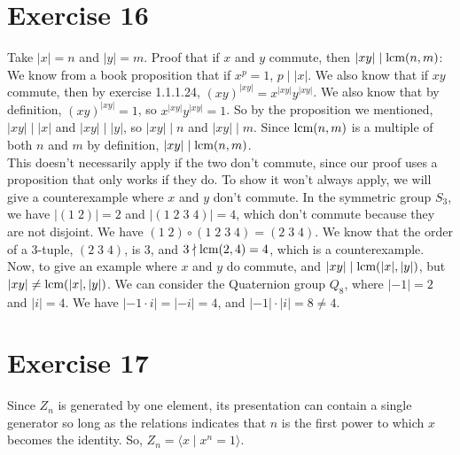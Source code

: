 \documentclass[12pt]{article}
\begin{document}
    \section*{Exercise 16}
    Take $|x| = n$ and $|y| = m$.
    Proof that if $x$ and $y$ commute,
    then $|xy| \mid \text{lcm}(n, m)$: \\
    We know from a book proposition that if $x^p = 1$, $p \mid |x|$.
    We also know that if $xy$ commute,
    then by exercise 1.1.1.24, $(xy)^{|xy|} = x^{|xy|}y^{|xy|}$.
    We also know that by definition, $(xy)^{|xy|} = 1$,
    so $x^{|xy|}y^{|xy|} = 1$.
    So by the proposition we mentioned,
    $|xy| \mid |x|$ and $|xy| \mid |y|$,
    so $|xy| \mid n$ and $|xy| \mid m$.
    Since $\text{lcm}(n, m)$ is a multiple of both $n$ and $m$ by definition,
    $|xy| \mid \text{lcm}(n, m)$. \\
    This doesn't necessarily apply if the two don't commute,
    since our proof uses a proposition that only works if they do.
    To show it won't always apply, we will give a counterexample
    where $x$ and $y$ don't commute.
    In the symmetric group $S_3$,
    we have $|(1\;2)| = 2$ and $|(1\;2\;3\;4)| = 4$,
    which don't commute because they are not disjoint.
    We have $(1\;2) \circ (1\;2\;3\;4) = (2\;3\;4)$.
    We know that the order of a 3-tuple, $(2\;3\;4)$, is 3, 
    and $3 \nmid \text{lcm}(2, 4) = 4$, 
    which is a counterexample. \\
    Now, to give an example where $x$ and $y$ do commute,
    and $|xy| \mid \text{lcm}(|x|, |y|)$, but $|xy| \neq \text{lcm}(|x|, |y|)$.
    We can consider the Quaternion group $Q_8$,
    where $|-1| = 2$ and $|i| = 4$.
    We have $|-1 \cdot i| = |-i| = 4$,
    and $|-1| \cdot |i| = 8 \neq 4$.


    \section*{Exercise 17}
    Since $Z_n$ is generated by one element,
    its presentation can contain a single generator
    so long as the relations indicates that $n$ is the first power
    to which $x$ becomes the identity.
    So, $Z_n = \langle x \mid x^n = 1 \rangle$.
\end{document}
